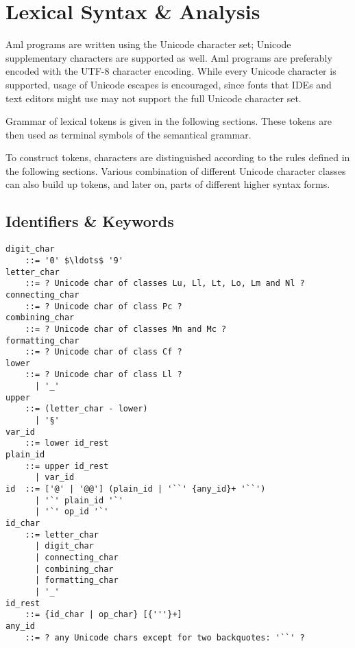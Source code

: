 
\newcommand{\Unicode}[1]{\mbox{$\backslash$u{#1}}}
\newcommand{\UnicodeRange}[2]{\mbox{$\backslash$u{#1}-$\backslash$u{#2}}}

\chapter{Lexical Syntax \& Analysis}
\label{sec:lexical-analysis}

\minitoc

Aml programs are written using the Unicode character set; Unicode supplementary characters are supported as well. Aml programs are preferably encoded with the UTF-8 character encoding. While every Unicode character is supported, usage of Unicode escapes is encouraged, since fonts that IDEs and text editors might use may not support the full Unicode character set.

Grammar of lexical tokens is given in the following sections. These tokens are then used as terminal symbols of the semantical grammar. 

To construct tokens, characters are distinguished according to the rules defined in the following sections. Various combination of different Unicode character classes can also build up tokens, and later on, parts of different higher syntax forms. 


\newpage






\section{Identifiers \& Keywords}
\label{sec:identifiers}
\label{sec:keywords}

\syntax\begin{lstlisting}[deletekeywords={of,and,class,for}]
digit_char 
    ::= '0' $\ldots$ '9'
letter_char
    ::= ? Unicode char of classes Lu, Ll, Lt, Lo, Lm and Nl ?
connecting_char 
    ::= ? Unicode char of class Pc ?
combining_char
    ::= ? Unicode char of classes Mn and Mc ?
formatting_char 
    ::= ? Unicode char of class Cf ?
lower 
    ::= ? Unicode char of class Ll ? 
      | '_'
upper 
    ::= (letter_char - lower) 
      | '§'
var_id 
    ::= lower id_rest
plain_id 
    ::= upper id_rest
      | var_id
id  ::= ['@' | '@@'] (plain_id | '``' {any_id}+ '``')
      | '`' plain_id '`'
      | '`' op_id '`'
id_char 
    ::= letter_char
      | digit_char
      | connecting_char
      | combining_char
      | formatting_char
      | '_'
id_rest 
    ::= {id_char | op_char} [{'''}+]
any_id 
    ::= ? any Unicode chars except for two backquotes: '``' ?
\end{lstlisting}

